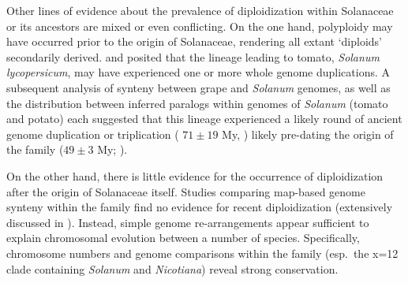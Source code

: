 Other lines of evidence about the prevalence of diploidization within Solanaceae or its ancestors are mixed or even conflicting.
On the one hand, polyploidy may have occurred prior to the origin of Solanaceae, rendering all extant `diploids' secondarily derived.
 and \citet{blanc2004} posited that the lineage leading to tomato, \emph{Solanum lycopersicum}, may have experienced one or more whole genome duplications.
A subsequent analysis of synteny between grape and \emph{Solanum} genomes, as well as the distribution between inferred paralogs within genomes of \emph{Solanum} (tomato and potato) each suggested that this lineage experienced a likely round of ancient genome duplication or triplication ( $71 \pm 19$ My, \citet{tomato2012})  likely pre-dating the origin of the family ($49 \pm 3$ My; \citealt{sarkinen_2013}). 


On the other hand, there is little evidence for the occurrence of diploidization after the origin of Solanaceae itself.
Studies comparing map-based genome synteny within the family find no evidence for recent diploidization (extensively discussed in \citet{wu_2010a}).
Instead, simple genome re-arrangements appear sufficient to explain chromosomal evolution between a number of species. %
Specifically, chromosome numbers and genome comparisons within the family (esp.\ the x=12 clade containing \textit{Solanum} and \textit{Nicotiana}) reveal strong conservation.


